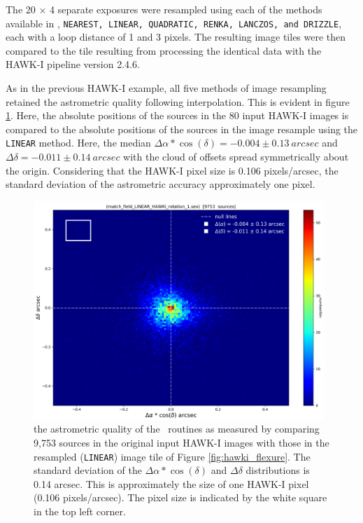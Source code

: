 The 20 $\times$ 4 separate exposures were resampled using each of the methods available in \hdrlresample, {\tt NEAREST, LINEAR, QUADRATIC, RENKA, LANCZOS,
and DRIZZLE}, each with a loop distance of 1 and 3 pixels.   The resulting image tiles were then compared to the tile resulting from processing the identical
data with the HAWK-I pipeline version 2.4.6.

As in the previous HAWK-I example, all five methods of image resampling retained the astrometric quality following interpolation.  This is evident in 
figure \ref{fig:radec_flexure}.  Here, the absolute positions of the sources in the 80 input HAWK-I images is compared to the absolute positions
of the sources in the image resample using the {\tt LINEAR} method.   Here, the median $\Delta\alpha*\cos(\delta)=-0.004\pm0.13\ arcsec$ and 
$\Delta\delta=-0.011\pm0.14\ arcsec$ with the cloud of offsets spread symmetrically about the origin.  
Considering that the HAWK-I pixel size is 0.106 pixels/arcsec, the standard deviation of the astrometric accuracy approximately one pixel.

\begin{figure}[H]
\centering
\includegraphics[width=11cm]{figures/match_field_LINEAR_HAWKI_rotation_1_RA_DEC_scatter_plot.png}
\caption[]
	{\footnotesize  the astrometric quality of the \hdrlresample\ routines as measured by comparing 9,753 sources in the original input HAWK-I images
	with those in the resampled ({\tt LINEAR}) image tile of Figure \ref{fig:hawki_flexure}.
	The standard deviation of the $\Delta\alpha*\cos(\delta)$ and $\Delta\delta$ distributions is 0.14 arcsec. This is approximately the size of one HAWK-I
	pixel (0.106 pixels/arcsec).  The pixel size is indicated by the white square in the top left corner.
	}
	\label{fig:radec_flexure}
\end{figure}

